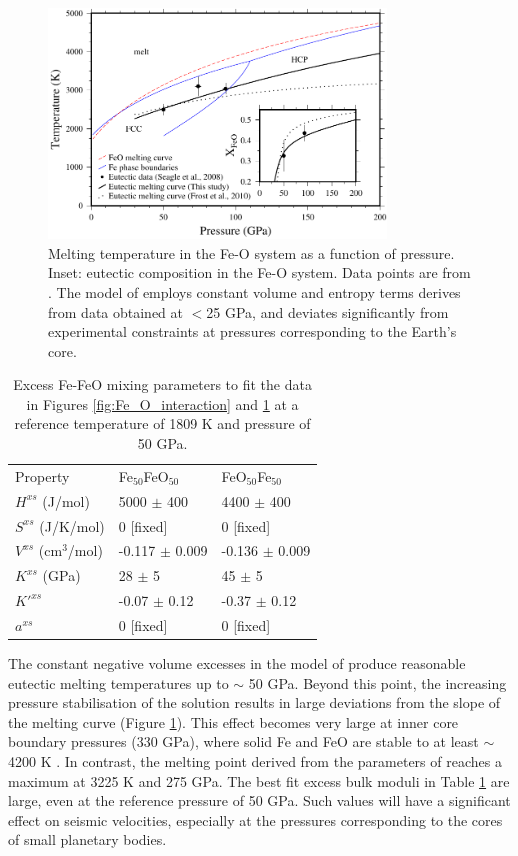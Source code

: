 \documentclass[review]{elsarticle}
\begin{document}
\begin{figure}[ht!]
  \centering
  \includegraphics[width=0.8\textwidth]{figures/Fe_FeO_T_X_eutectic}
  \caption{Melting temperature in the Fe-O system as a function of pressure. Inset: eutectic composition in the Fe-O system. Data points are from \cite{SHCPW2008}. The model of \cite{Frostetal2010} employs constant volume and entropy terms derives from data obtained at $<$25 GPa, and deviates significantly from experimental constraints at pressures corresponding to the Earth's core.}
  \label{fig:Fe_O_melting}
\end{figure}

\begin{table}[ht!]
\centering
\caption{Excess Fe-FeO mixing parameters to fit the data in Figures \ref{fig:Fe_O_interaction} and \ref{fig:Fe_O_melting} at a reference temperature of 1809 K and pressure of 50 GPa.}
\label{tab:Fe_FeO}
\begin{tabular}{lll}
  Property        & Fe$_{50}$FeO$_{50}$  & FeO$_{50}$Fe$_{50}$ \\
  $H^{xs}$ (J/mol) &  5000 $\pm$ 400 & 4400 $\pm$ 400  \\
  $S^{xs}$ (J/K/mol)  & 0 [fixed] & 0 [fixed] \\
  $V^{xs}$ (cm$^3$/mol)   & -0.117 $\pm$ 0.009 &  -0.136 $\pm$ 0.009 \\
  $K^{xs}$  (GPa)  & 28 $\pm$ 5 & 45 $\pm$ 5  \\
  $K'^{xs}$   & -0.07 $\pm$ 0.12 & -0.37 $\pm$ 0.12  \\
  $a^{xs}$   & 0 [fixed] & 0 [fixed]  
\end{tabular}
\end{table}


The constant negative volume excesses in the model of \cite{Frostetal2010} produce reasonable eutectic melting temperatures up to $\sim$ 50 GPa. Beyond this point, the increasing pressure stabilisation of the solution results in large deviations from the slope of the melting curve (Figure \ref{fig:Fe_O_melting}). This effect becomes very large at inner core boundary pressures (330 GPa), where solid Fe and FeO are stable to at least $\sim$4200 K \citep{OTHOH2011}. In contrast, the melting point derived from the parameters of \cite{Frostetal2010} reaches a maximum at 3225 K and 275 GPa. The best fit excess bulk moduli in Table \ref{tab:Fe_FeO} are large, even at the reference pressure of 50 GPa. Such values will have a significant effect on seismic velocities, especially at the pressures corresponding to the cores of small planetary bodies.
\end{document}
